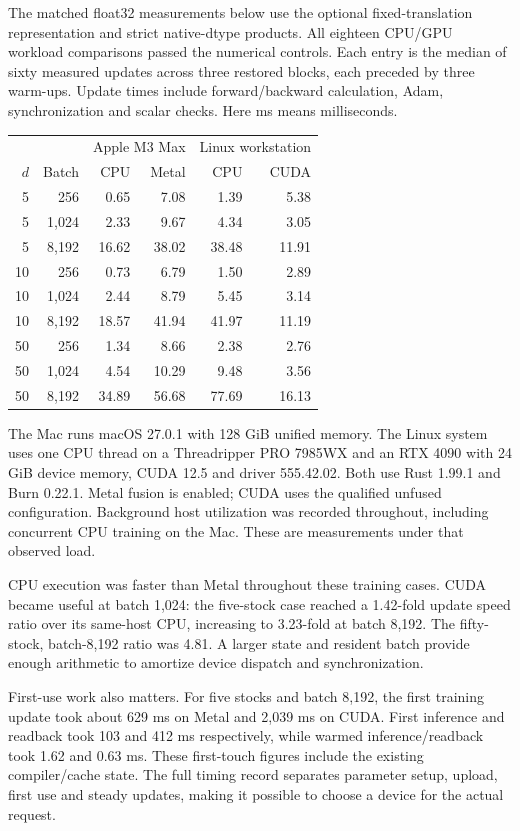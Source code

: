 The matched float32 measurements below use the optional fixed-translation
representation and strict native-dtype products. All eighteen CPU/GPU workload
comparisons passed the numerical controls. Each entry is the median of sixty
measured updates across three restored blocks, each preceded by three warm-ups.
Update times include forward/backward calculation, Adam, synchronization and
scalar checks. Here ms means milliseconds.

\begin{center}
\setlength{\tabcolsep}{3pt}
\begin{tabular}{rrrrrr}
\toprule
& &\multicolumn{2}{c}{Apple M3 Max}&\multicolumn{2}{c}{Linux workstation}\\
$d$&Batch&CPU&Metal&CPU&CUDA\\
\midrule
5&256&0.65&7.08&1.39&5.38\\
5&1,024&2.33&9.67&4.34&3.05\\
5&8,192&16.62&38.02&38.48&11.91\\
10&256&0.73&6.79&1.50&2.89\\
10&1,024&2.44&8.79&5.45&3.14\\
10&8,192&18.57&41.94&41.97&11.19\\
50&256&1.34&8.66&2.38&2.76\\
50&1,024&4.54&10.29&9.48&3.56\\
50&8,192&34.89&56.68&77.69&16.13\\
\bottomrule
\end{tabular}
\end{center}
The Mac runs macOS 27.0.1 with 128 GiB unified memory. The Linux system uses
one CPU thread on a Threadripper PRO 7985WX and an RTX 4090 with 24 GiB device
memory, CUDA 12.5 and driver 555.42.02. Both use Rust 1.99.1 and Burn 0.22.1.
Metal fusion is enabled; CUDA uses the qualified unfused configuration.
Background host utilization was recorded throughout, including concurrent
CPU training on the Mac. These are measurements under that observed load.

CPU execution was faster than Metal throughout these training cases. CUDA
became useful at batch 1,024: the five-stock case reached a 1.42-fold update
speed ratio over its same-host CPU, increasing to 3.23-fold at batch 8,192.
The fifty-stock, batch-8,192 ratio was 4.81. A larger state and resident batch
provide enough arithmetic to amortize device dispatch and synchronization.

First-use work also matters. For five stocks and batch 8,192, the first training
update took about 629 ms on Metal and 2,039 ms on CUDA. First inference and
readback took 103 and 412 ms respectively, while warmed inference/readback took
1.62 and 0.63 ms. These first-touch figures include the existing compiler/cache
state. The full timing record separates parameter setup, upload, first use and
steady updates, making it possible to choose a device for the actual request.
